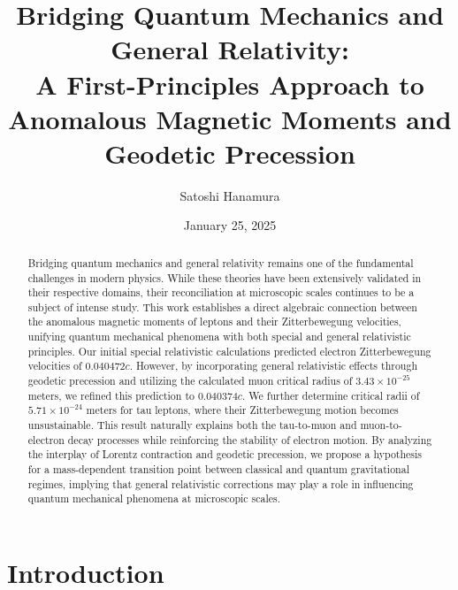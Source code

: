 \documentclass[%
 reprint,
 amsmath,amssymb,
 aps,
]{revtex4-1}
\numberwithin{equation}{section}%
\begin{document}
\title{Bridging Quantum Mechanics and General Relativity: \\ A First-Principles Approach to Anomalous Magnetic Moments and Geodetic Precession}

\author{Satoshi Hanamura}
\date{January 25, 2025}


\begin{abstract}
Bridging quantum mechanics and general relativity remains one of the fundamental challenges in modern physics. While these theories have been extensively validated in their respective domains, their reconciliation at microscopic scales continues to be a subject of intense study. This work establishes a direct algebraic connection between the anomalous magnetic moments of leptons and their Zitterbewegung velocities, unifying quantum mechanical phenomena with both special and general relativistic principles. Our initial special relativistic calculations predicted electron Zitterbewegung velocities of $0.040472c$. However, by incorporating general relativistic effects through geodetic precession and utilizing the calculated muon critical radius of $3.43 \times 10^{-25}$ meters, we refined this prediction to $0.040374c$. We further determine critical radii of $5.71 \times 10^{-24}$ meters for tau leptons, where their Zitterbewegung motion becomes unsustainable. This result naturally explains both the tau-to-muon and muon-to-electron decay processes while reinforcing the stability of electron motion. By analyzing the interplay of Lorentz contraction and geodetic precession, we propose a hypothesis for a mass-dependent transition point between classical and quantum gravitational regimes, implying that general relativistic corrections may play a role in influencing quantum mechanical phenomena at microscopic scales.
\end{abstract}

\maketitle


\section{Introduction}
\end{document}
